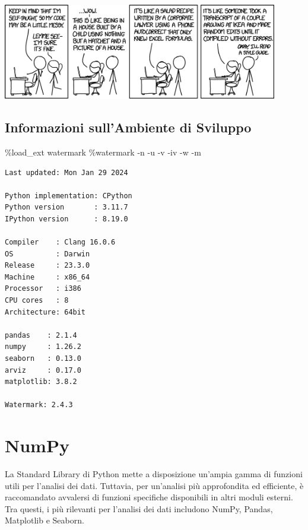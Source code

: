 \documentclass[
  letterpaper,
  krantz2]{{[}./krantz{]}}
\newenvironment{Shaded}{\begin{snugshade}}{\end{snugshade}}
\newcommand{\NormalTok}[1]{\textcolor[rgb]{0.00,0.23,0.31}{#1}}
\newcommand{\OperatorTok}[1]{\textcolor[rgb]{0.37,0.37,0.37}{#1}}
\begin{document}
\includegraphics[width=0.9\textwidth,height=\textheight]{chapters/python/../../figures/code_quality_2x.png}

\section{Informazioni sull'Ambiente di
Sviluppo}\label{informazioni-sullambiente-di-sviluppo-1}

\begin{Shaded}
\begin{Highlighting}[]
\OperatorTok{\%}\NormalTok{load\_ext watermark}
\OperatorTok{\%}\NormalTok{watermark }\OperatorTok{{-}}\NormalTok{n }\OperatorTok{{-}}\NormalTok{u }\OperatorTok{{-}}\NormalTok{v }\OperatorTok{{-}}\NormalTok{iv }\OperatorTok{{-}}\NormalTok{w }\OperatorTok{{-}}\NormalTok{m}
\end{Highlighting}
\end{Shaded}

\begin{verbatim}
Last updated: Mon Jan 29 2024

Python implementation: CPython
Python version       : 3.11.7
IPython version      : 8.19.0

Compiler    : Clang 16.0.6 
OS          : Darwin
Release     : 23.3.0
Machine     : x86_64
Processor   : i386
CPU cores   : 8
Architecture: 64bit

pandas    : 2.1.4
numpy     : 1.26.2
seaborn   : 0.13.0
arviz     : 0.17.0
matplotlib: 3.8.2

Watermark: 2.4.3
\end{verbatim}

\chapter{NumPy}\label{sec-numpy}

La Standard Library di Python mette a disposizione un'ampia gamma di
funzioni utili per l'analisi dei dati. Tuttavia, per un'analisi più
approfondita ed efficiente, è raccomandato avvalersi di funzioni
specifiche disponibili in altri moduli esterni. Tra questi, i più
rilevanti per l'analisi dei dati includono NumPy, Pandas, Matplotlib e
Seaborn.
\end{document}
